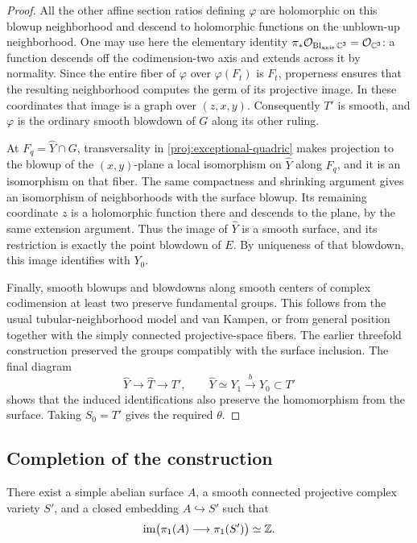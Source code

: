 \begin{proof}
All the other affine section ratios defining $\varphi$ are holomorphic
on this blowup neighborhood and descend to holomorphic functions on
the unblown-up neighborhood.  One may use here the elementary identity
$\pi_*\mathcal O_{\operatorname{Bl}_{\mathrm{axis}}\mathbb C^3}
=\mathcal O_{\mathbb C^3}$: a function descends off the codimension-two axis
and extends across it by normality.  Since the entire fiber of
$\varphi$ over $\varphi(F_t)$ is $F_t$, properness ensures that the
resulting neighborhood computes the germ of its projective image.
In these coordinates that image is a graph over $(z,x,y)$.
Consequently $T'$ is smooth, and $\varphi$ is the ordinary smooth
blowdown of $G$ along its other ruling.

At $F_q=\widehat Y\cap G$, transversality in
\eqref{proj:exceptional-quadric} makes projection to the blowup of the
$(x,y)$-plane a local isomorphism on $\widehat Y$ along $F_q$, and it
is an isomorphism on that fiber.  The same compactness and shrinking
argument gives an isomorphism of neighborhoods with the surface
blowup.  Its remaining coordinate $z$ is a holomorphic function there and
descends to the plane, by the same extension argument.  Thus the
image of $\widehat Y$ is a smooth surface, and its restriction is
exactly the point blowdown of $E$.  By uniqueness of that blowdown,
this image identifies with $Y_0$.

Finally, smooth blowups and blowdowns along smooth centers of complex
codimension at least two preserve fundamental groups.  This follows
from the usual tubular-neighborhood model and van Kampen, or from
general position together with the simply connected projective-space
fibers.  The earlier threefold construction preserved the groups
compatibly with the surface inclusion.  The final diagram
\[
 \widehat Y\longrightarrow\widehat T\longrightarrow T',
 \qquad \widehat Y\simeq Y_1\xrightarrow{b}Y_0\subset T'
\]
shows that the induced identifications also preserve the homomorphism
from the surface.  Taking $S_0=T'$ gives the required $\theta$.
\end{proof}

\subsection{Completion of the construction}

\begin{theorem}\label{thm:cyclic-embedding}
There exist a simple abelian surface $A$, a smooth connected projective
complex variety $S'$, and a closed embedding $A\hookrightarrow S'$
such that
\[
 \operatorname{im}\bigl(\pi_1(A)\longrightarrow\pi_1(S')\bigr)\simeq\mathbb Z.
\]
\end{theorem}

